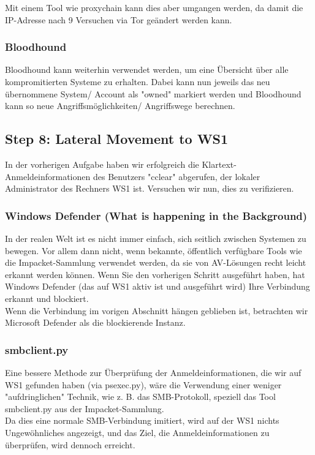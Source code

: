 Mit einem Tool wie proxychain kann dies aber umgangen werden, da damit die IP-Adresse nach 9 Versuchen via Tor geändert werden kann.

\subsubsection{Bloodhound}
Bloodhound kann weiterhin verwendet werden, um eine Übersicht über alle kompromitierten Systeme zu erhalten. Dabei kann nun jeweils das neu übernommene System/ Account als "owned" markiert werden und Bloodhound kann so neue Angriffsmöglichkeiten/ Angriffswege berechnen.



\subsection{Step 8: Lateral Movement to WS1}
In der vorherigen Aufgabe haben wir erfolgreich die Klartext-Anmeldeinformationen des Benutzers "cclear" abgerufen, der lokaler Administrator des Rechners WS1 ist. Versuchen wir nun, dies zu verifizieren.

\subsubsection{Windows Defender (What is happening in the Background)}
In der realen Welt ist es nicht immer einfach, sich seitlich zwischen Systemen zu bewegen. Vor allem dann nicht, wenn bekannte, öffentlich verfügbare Tools wie die Impacket-Sammlung verwendet werden, da sie von AV-Lösungen recht leicht erkannt werden können. Wenn Sie den vorherigen Schritt ausgeführt haben, hat Windows Defender (das auf WS1 aktiv ist und ausgeführt wird) Ihre Verbindung erkannt und blockiert.\\

Wenn die Verbindung im vorigen Abschnitt hängen geblieben ist, betrachten wir Microsoft Defender als die blockierende Instanz.

\subsubsection{smbclient.py}
Eine bessere Methode zur Überprüfung der Anmeldeinformationen, die wir auf WS1 gefunden haben (via psexec.py), wäre die Verwendung einer weniger "aufdringlichen" Technik, wie z. B. das SMB-Protokoll, speziell das Tool smbclient.py aus der Impacket-Sammlung.\\

Da dies eine normale SMB-Verbindung imitiert, wird auf der WS1 nichts Ungewöhnliches angezeigt, und das Ziel, die Anmeldeinformationen zu überprüfen, wird dennoch erreicht.

